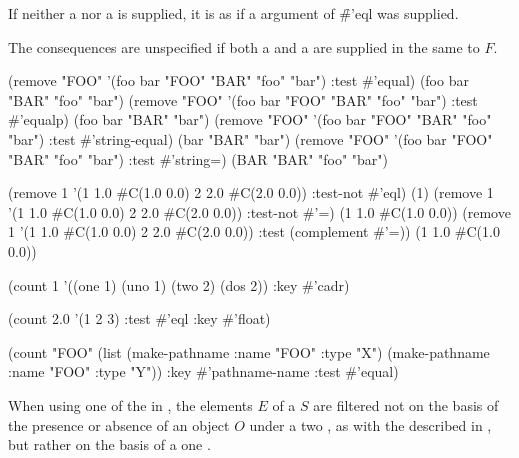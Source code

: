 If neither a  nor a   is supplied, 
it is as if a  argument of \f{\#'eql} was supplied.

The consequences are unspecified if both a  and a  
are supplied in the same  to $F$.


\code
 (remove "FOO" '(foo bar "FOO" "BAR" "foo" "bar") :test #'equal)
\EV (foo bar "BAR" "foo" "bar")
 (remove "FOO" '(foo bar "FOO" "BAR" "foo" "bar") :test #'equalp)
\EV (foo bar "BAR" "bar")
 (remove "FOO" '(foo bar "FOO" "BAR" "foo" "bar") :test #'string-equal)
\EV (bar "BAR" "bar")
 (remove "FOO" '(foo bar "FOO" "BAR" "foo" "bar") :test #'string=)
\EV (BAR "BAR" "foo" "bar")

 (remove 1 '(1 1.0 #C(1.0 0.0) 2 2.0 #C(2.0 0.0)) :test-not #'eql)
\EV (1)
 (remove 1 '(1 1.0 #C(1.0 0.0) 2 2.0 #C(2.0 0.0)) :test-not #'=)
\EV (1 1.0 #C(1.0 0.0))
 (remove 1 '(1 1.0 #C(1.0 0.0) 2 2.0 #C(2.0 0.0)) :test (complement #'=))
\EV (1 1.0 #C(1.0 0.0))

 (count 1 '((one 1) (uno 1) (two 2) (dos 2)) :key #'cadr) 

 (count 2.0 '(1 2 3) :test #'eql :key #'float) 

 (count "FOO" (list (make-pathname :name "FOO" :type "X")  
                    (make-pathname :name "FOO" :type "Y"))
        :key #'pathname-name
        :test #'equal)
\endcode

\endsubsubsection%

\endsubsection%


When using one of the  in \thenextfigure,
the elements $E$ of a  $S$ are filtered
not on the basis of the presence or absence of an object $O$ 
under a two  ,
as with the  described in \secref\SatisfyingTheTwoArgTest,
but rather on the basis of a one  .


